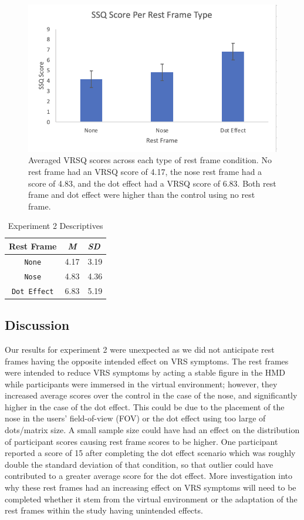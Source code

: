 \documentclass[sigconf]{acmart}
\begin{document}
\begin{figure}[h]
  \centering
  \includegraphics[width=\linewidth]{samples/C2 Graph.png}
  \caption{Averaged VRSQ scores across each type of rest frame condition. No rest frame had an VRSQ score of 4.17, the nose rest frame had a score of 4.83, and the dot effect had a VRSQ score of 6.83. Both rest frame and dot effect were higher than the control using no rest frame.}
\end{figure}

\begin{table}
  \caption{Experiment 2 Descriptives}
  \label{tab:commands}
  \begin{tabular}{ccl}
    \toprule
    Rest Frame & \textit{M} & \textit{SD}\\
    \midrule
    \texttt{None} & 4.17 & 3.19 \\
    \texttt{Nose}& 4.83 & 4.36\\
    \texttt{Dot Effect} & 6.83 & 5.19\\
    \bottomrule
  \end{tabular}
\end{table}

\subsection{Discussion}
Our results for experiment 2 were unexpected as we did not anticipate rest frames having the opposite intended effect on VRS symptoms. The rest frames were intended to reduce VRS symptoms by acting a stable figure in the HMD while participants were immersed in the virtual environment; however, they increased average scores over the control in the case of the nose, and significantly higher in the case of the dot effect. This could be due to the placement of the nose in the users' field-of-view (FOV) or the dot effect using too large of dots/matrix size. A small sample size could have had an effect on the distribution of participant scores causing rest frame scores to be higher. One participant reported a score of 15 after completing the dot effect scenario which was roughly double the standard deviation of that condition, so that outlier could have contributed to a greater average score for the dot effect. More investigation into why these rest frames had an increasing effect on VRS symptoms will need to be completed whether it stem from the virtual environment or the adaptation of the rest frames within the study having unintended effects.
\end{document}
